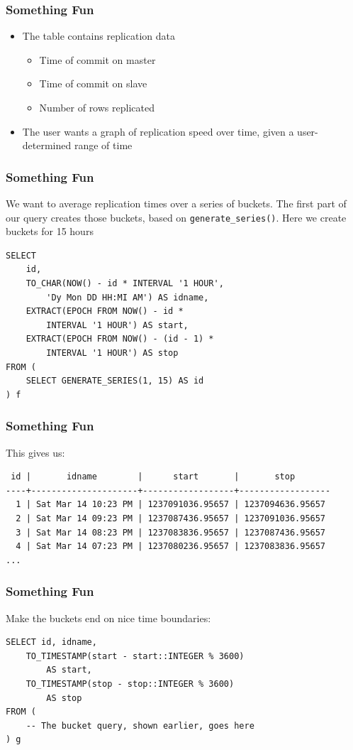 \documentclass{beamer}
\begin{document}
\begin{frame}
    \frametitle{Something Fun}
    \begin{itemize}
        \item The table contains replication data
        \pause
        \begin{itemize}
            \item Time of commit on master
            \pause
            \item Time of commit on slave
            \pause
            \item Number of rows replicated
            \pause
        \end{itemize}
        \item The user wants a graph of replication speed over time, given a user-determined range of time
    \end{itemize}
\end{frame}

\begin{frame}[fragile]
    \frametitle{Something Fun}
    We want to average replication times over a series of buckets. The first
    part of our query creates those buckets, based on
    \texttt{generate\_series()}. Here we create buckets for 15 hours
    \begin{verbatim}
SELECT 
    id,
    TO_CHAR(NOW() - id * INTERVAL '1 HOUR',
        'Dy Mon DD HH:MI AM') AS idname,
    EXTRACT(EPOCH FROM NOW() - id *
        INTERVAL '1 HOUR') AS start,
    EXTRACT(EPOCH FROM NOW() - (id - 1) *
        INTERVAL '1 HOUR') AS stop
FROM (
    SELECT GENERATE_SERIES(1, 15) AS id
) f
    \end{verbatim}
\end{frame}

\begin{frame}[fragile]
    \frametitle{Something Fun}
    This gives us:
    \scriptsize
    \begin{verbatim}
 id |       idname        |      start       |       stop
----+---------------------+------------------+------------------
  1 | Sat Mar 14 10:23 PM | 1237091036.95657 | 1237094636.95657
  2 | Sat Mar 14 09:23 PM | 1237087436.95657 | 1237091036.95657
  3 | Sat Mar 14 08:23 PM | 1237083836.95657 | 1237087436.95657
  4 | Sat Mar 14 07:23 PM | 1237080236.95657 | 1237083836.95657
...
    \end{verbatim}
    \normalsize
\end{frame}

\begin{frame}[fragile]
    \frametitle{Something Fun}
    Make the buckets end on nice time boundaries:
    \begin{verbatim}
SELECT id, idname,
    TO_TIMESTAMP(start - start::INTEGER % 3600)
        AS start,
    TO_TIMESTAMP(stop - stop::INTEGER % 3600)
        AS stop
FROM (
    -- The bucket query, shown earlier, goes here
) g
    \end{verbatim}
\end{frame}
\end{document}
